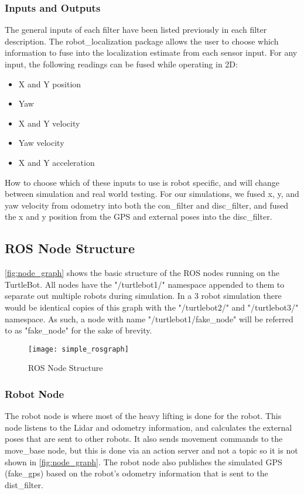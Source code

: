 \documentclass[thesis.tex]{subfile}
\begin{document}
\subsubsection{Inputs and Outputs}
The general inputs of each filter have been listed previously in each filter description. The robot\_localization package allows the user to choose which information to fuse into the localization estimate from each sensor input. For any input, the following readings can be fused while operating in 2D:
\begin{itemize}
\item X and Y position
\item Yaw
\item X and Y velocity
\item Yaw velocity
\item X and Y acceleration
\end{itemize}
How to choose which of these inputs to use is robot specific, and will change between simulation and real world testing. For our simulations, we fused x, y, and yaw velocity from odometry into both the \gls{con_filter} and \gls{disc_filter}, and fused the x and y position from the GPS and external poses into the \gls{disc_filter}.
 
\subsection{ROS Node Structure}
\autoref{fig:node_graph} shows the basic structure of the ROS nodes running on the TurtleBot. All nodes have the "/turtlebot1/" namespace appended to them to separate out multiple robots during simulation. In a 3 robot simulation there would be identical copies of this graph with the "/turtlebot2/" and "/turtlebot3/" namespace. As such, a node with name "/turtlebot1/fake\_node" will be referred to as "fake\_node" for the sake of brevity.
 
\begin{landscape}
\begin{figure}
\texttt{[image: simple\_rosgraph]}
\caption{ROS Node Structure}
\label{fig:node_graph}
\end{figure}
\end{landscape}

\subsubsection{Robot Node}
The robot node is where most of the heavy lifting is done for the robot. This node listens to the Lidar and odometry information, and calculates the external poses that are sent to other robots. It also sends movement commands to the move\_base node, but this is done via an action server and not a topic so it is not shown in \autoref{fig:node_graph}. The robot node also publishes the simulated GPS (fake\_gps) based on the robot's odometry information that is sent to the \gls{dist_filter}.
\end{document}
